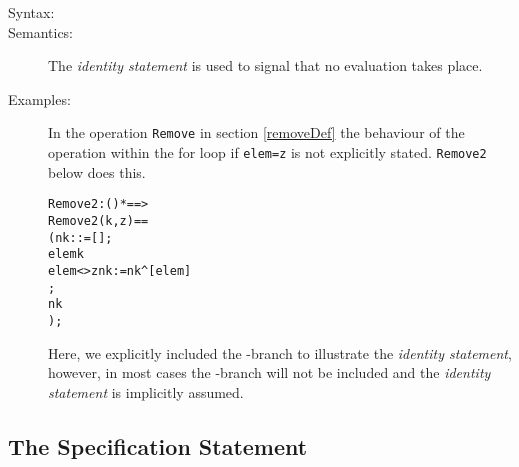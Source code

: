 \documentclass[\pformat,12pt]{article}
\begin{document}
\begin{description}
\item[Syntax:]


\item[Semantics:] The {\it identity statement\/} is used to signal that no
  evaluation takes place.

\item[Examples:] In the operation \texttt{Remove} in section
  \ref{removeDef} the behaviour of the operation within the
  \textsf{for} loop if \texttt{elem=z} is not explicitly
  stated. \texttt{Remove2} below does this.
  \begin{alltt}
  Remove2 : () *  ==> 
  Remove2 (k,z) ==
    ( nk :  := [];
      elem  k 
        elem <> z  nk := nk^[elem]
       ;
      nk
    );
  \end{alltt}
  Here, we explicitly included the -branch to illustrate the
  {\it identity statement}, however, in most cases the -branch
  will not be included and the {\it identity statement\/} is implicitly
  assumed.

\end{description}


\subsection{The Specification Statement} \label{se:specification}
\end{document}
